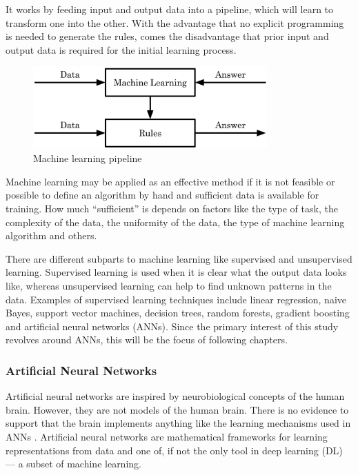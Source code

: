 It works by feeding input and output data into a pipeline, which will learn to transform one into the other. With the advantage that no explicit programming is needed to generate the rules, comes the disadvantage that prior input and output data is required for the initial learning process.

\begin{figure}[H]
\centering
\par
\includegraphics[width=0.8\textwidth]{imgs/ml_pipeline.png}
\caption{Machine learning pipeline}
\par
\end{figure}

Machine learning may be applied as an effective method if it is not feasible or possible to define an algorithm by hand and sufficient data is available for training. How much “sufficient” is depends on factors like the type of task, the complexity of the data, the uniformity of the data, the type of machine learning algorithm and others.

There are different subparts to machine learning like supervised and unsupervised learning. Supervised learning is used when it is clear what the output data looks like, whereas unsupervised learning can help to find unknown patterns in the data. Examples of supervised learning techniques include linear regression, naive Bayes, support vector machines, decision trees, random forests, gradient boosting and artificial neural networks (ANNs). Since the primary interest of this study revolves around ANNs, this will be the focus of following chapters.

\subsubsection{Artificial Neural Networks}

Artificial neural networks are inspired by neurobiological concepts of the human brain. However, they are not models of the human brain. There is no evidence to support that the brain implements anything like the learning mechanisms used in ANNs \cite{Chollet2017}. Artificial neural networks are mathematical frameworks for learning representations from data and one of, if not the only tool in deep learning (DL) --- a subset of machine learning.


